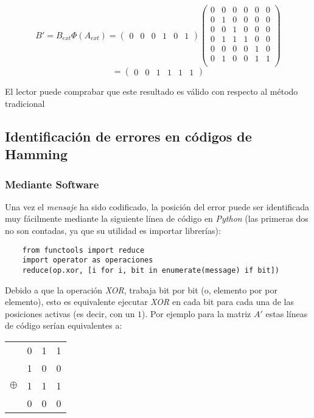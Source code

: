 \documentclass{article}
\begin{document}
$$
B' = B_{ext} \Phi(A_{ext}) = \begin{pmatrix}
    0 & 0 & 0 & 1 & 0 & 1
\end{pmatrix}
\begin{pmatrix}
    0 & 0 & 0 & 0 & 0 & 0 \\
    0 & 1 & 0 & 0 & 0 & 0 \\
    0 & 0 & 1 & 0 & 0 & 0 \\
    0 & 1 & 1 & 1 & 0 & 0 \\
    0 & 0 & 0 & 0 & 1 & 0 \\
    0 & 1 & 0 & 0 & 1 & 1 \\
\end{pmatrix}
$$$$
= \begin{pmatrix}
    0 & 0 & 1 & 1 & 1 & 1
\end{pmatrix}
$$

El lector puede comprabar que este resultado es válido con respecto al método tradicional

\subsection{Identificación de errores en códigos de Hamming}

\subsubsection{Mediante Software}

Una vez el \textit{mensaje} ha sido codificado, la posición del error puede ser identificada muy fácilmente mediante la siguiente línea de código en \textit{Python} (las primeras dos no son contadas, ya que su utilidad es importar librerías):

\begin{verbatim}
    from functools import reduce
    import operator as operaciones
    reduce(op.xor, [i for i, bit in enumerate(message) if bit])
\end{verbatim}

Debido a que la operación \textit{XOR}, trabaja bit por bit (o, elemento por por elemento), esto es equivalente ejecutar \textit{XOR} en cada bit para cada una de las posiciones activas (es decir, con un $1$). Por ejemplo para la matriz $A'$ estas líneas de código serían equivalentes a:

\begin{center}
\begin{tabular}{c c c c}
    & 0 & 1 & 1 \\
    & 1 & 0 & 0 \\
    $\oplus$ & 1 & 1 & 1 \\
    \hline
    & 0 & 0 & 0
\end{tabular}
\end{center}
\end{document}
